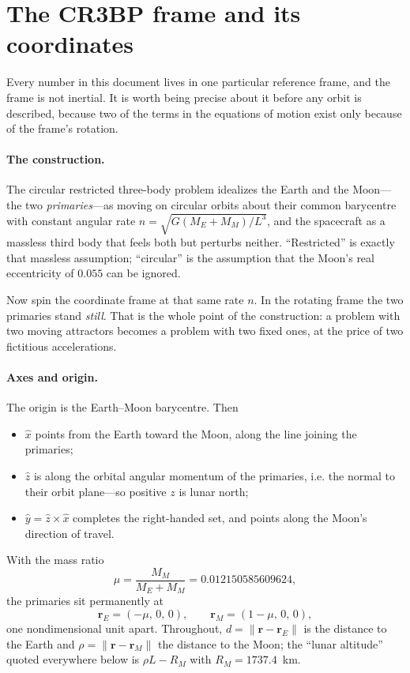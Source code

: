 \documentclass[11pt]{article}
\newcommand{\vecr}{\mathbf{r}}
\begin{document}
\tableofcontents

\section{The CR3BP frame and its coordinates}
\label{sec:frame}

Every number in this document lives in one particular reference frame, and the
frame is not inertial. It is worth being precise about it before any orbit is
described, because two of the terms in the equations of motion exist only
because of the frame's rotation.

\paragraph{The construction.} The circular restricted three-body problem
idealizes the Earth and the Moon---the two \emph{primaries}---as moving on
circular orbits about their common barycentre with constant angular rate
$n = \sqrt{G(M_E+M_M)/L^3}$, and the spacecraft as a massless third body that
feels both but perturbs neither. ``Restricted'' is exactly that massless
assumption; ``circular'' is the assumption that the Moon's real eccentricity of
$0.055$ can be ignored.

Now spin the coordinate frame at that same rate $n$. In the rotating frame the
two primaries stand \emph{still}. That is the whole point of the construction:
a problem with two moving attractors becomes a problem with two fixed ones, at
the price of two fictitious accelerations.

\paragraph{Axes and origin.} The origin is the Earth--Moon barycentre. Then

\begin{itemize}
  \item $\hat{x}$ points from the Earth toward the Moon, along the line joining
        the primaries;
  \item $\hat{z}$ is along the orbital angular momentum of the primaries, i.e.
        the normal to their orbit plane---so positive $z$ is lunar north;
  \item $\hat{y} = \hat{z} \times \hat{x}$ completes the right-handed set, and
        points along the Moon's direction of travel.
\end{itemize}

With the mass ratio
\[
  \mu = \frac{M_M}{M_E + M_M} = 0.012150585609624,
\]
the primaries sit permanently at
\[
  \vecr_{\!E} = (-\mu,\,0,\,0), \qquad \vecr_{\!M} = (1-\mu,\,0,\,0),
\]
one nondimensional unit apart. Throughout, $d = \lVert\vecr - \vecr_{\!E}\rVert$
is the distance to the Earth and $\rho = \lVert\vecr - \vecr_{\!M}\rVert$ the
distance to the Moon; the ``lunar altitude'' quoted everywhere below is
$\rho L - R_M$ with $R_M = 1737.4$~km.
\end{document}
